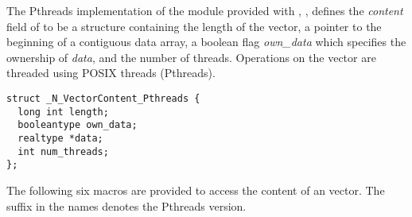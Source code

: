 
The Pthreads implementation of the {\nvector} module provided with {\sundials},
{\nvecpthreads}, defines the {\em content} field of  to be a structure 
containing the length of the vector, a pointer to the beginning of a contiguous 
data array, a boolean flag {\em own\_data} which specifies the ownership 
of {\em data}, and the number of threads.  
Operations on the vector are threaded using POSIX threads 
(Pthreads).
\begin{verbatim} 
struct _N_VectorContent_Pthreads {
  long int length;
  booleantype own_data;
  realtype *data;
  int num_threads;
};
\end{verbatim}
The following six macros are provided to access the content of an {\nvecpthreads}
vector. The suffix  in the names denotes the Pthreads version.
